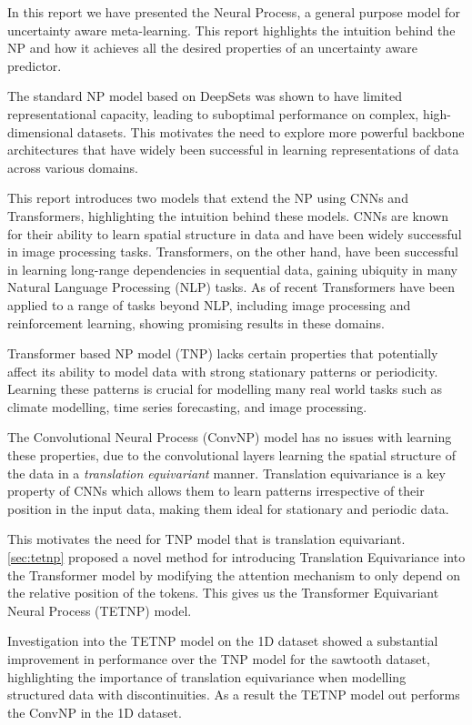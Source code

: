 \documentclass[../../main.tex]{subfiles}
\begin{document}
In this report we have presented the Neural Process, a general purpose model for uncertainty aware meta-learning. This report highlights the intuition behind the NP and how it achieves all the desired properties of an uncertainty aware predictor. 

The standard NP model based on DeepSets was shown to have limited representational capacity, leading to suboptimal performance on complex, high-dimensional datasets. This motivates the need to explore more powerful backbone architectures that have widely been successful in learning representations of data across various domains. 

This report introduces two models that extend the NP using CNNs and Transformers, highlighting the intuition behind these models. CNNs are known for their ability to learn spatial structure in data and have been widely successful in image processing tasks. Transformers, on the other hand, have been successful in learning long-range dependencies in sequential data, gaining ubiquity in many Natural Language Processing (NLP) tasks. As of recent Transformers have been applied to a range of tasks beyond NLP, including image processing and reinforcement learning, showing promising results in these domains. 

Transformer based NP model (TNP) lacks certain properties that potentially affect its ability to model data with strong stationary patterns or periodicity. Learning these patterns is crucial for modelling many real world tasks such as climate modelling, time series forecasting, and image processing. 

The Convolutional Neural Process (ConvNP) model has no issues with learning these properties, due to the convolutional layers learning the spatial structure of the data in a \emph{translation equivariant} manner. Translation equivariance is a key property of CNNs which allows them to learn patterns irrespective of their position in the input data, making them ideal for stationary and periodic data.

This motivates the need for TNP model that is translation equivariant. \autoref{sec:tetnp} proposed a novel method for introducing Translation Equivariance into the Transformer model by modifying the attention mechanism to only depend on the relative position of the tokens. This gives us the Transformer Equivariant Neural Process (TETNP) model.

Investigation into the TETNP model on the 1D dataset showed a substantial improvement in performance over the TNP model for the sawtooth dataset, highlighting the importance of translation equivariance when modelling structured data with discontinuities. As a result the TETNP model out performs the ConvNP in the 1D dataset.
\end{document}
